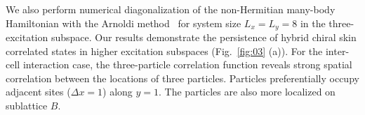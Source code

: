 \documentclass[longbibliography, aps, prx, amsmath, amssymb, amsfonts, twocolumn,superscriptaddress, footinbib]{revtex4-1}
\begin{document}
{{	%
	We also perform numerical diagonalization of the non-Hermitian many-body Hamiltonian with the Arnoldi method~\cite{arnoldi1951principle} for system size $L_x = L_y = 8$ in the three-excitation subspace. Our results demonstrate the persistence of hybrid chiral skin correlated states in higher excitation subspaces (Fig.~\ref{fig:03} (a)).
	For the inter-cell interaction case, the three-particle correlation function reveals strong spatial correlation between the locations of three particles. Particles preferentially occupy adjacent sites ($\Delta x =1$) along $y=1$. The particles are also more localized on sublattice $B$. }}
\end{document}
